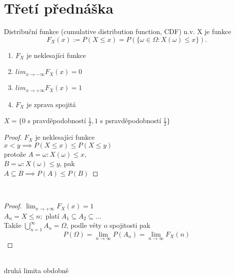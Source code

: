 \documentclass[../main.tex]{subfiles}
\begin{document}
\section{Třetí přednáška}

\begin{definition}
    Distribuční funkce (cumulative distribution function, CDF) n.v. X
    je funkce
    \[F_X(x) := P(X\leq x) = P(\{\omega \in \Omega : X(\omega) \leq x\}).\]
    \begin{enumerate}
        \item $F_X$ je neklesajíci funkce
        \item $lim_{x \rightarrow -\infty} F_X(x) = 0$
        \item $lim_{x \rightarrow +\infty} F_X(x) = 1$
        \item $F_X$ je zprava spojitá
    \end{enumerate}
\end{definition}

\begin{example}
    $X = \{0$ s pravděpodobností $\frac{1}{2}, 1$ s psravděpodobností $\frac{1}{2}\}$
\end{example}
\begin{proof}
    $F_X$ je neklesajíci funkce\\

    $x<y \implies P(X\leq x) \leq P(X\leq y)$\\
    protože $A = {\omega : X(\omega) \leq x}$,\\
    $B = {\omega : X(\omega) \leq y}$, pak\\
    $A\subseteq B \implies P(A) \leq P(B)$
\end{proof}\\
\begin{proof}
    $\lim_{x\rightarrow +\infty} F_X(x) = 1$\\

    $A_n = {X\leq n};$ platí $A_1 \subseteq A_2 \subseteq \dots$\\
    Takže $\bigcup^\infty_{n=1} A_n = \Omega$, podle véty o spojitosti pak\\
    \[P(\Omega) = \lim_{n\rightarrow \infty} P(A_n) = \lim_{n\rightarrow \infty} F_X(n)\]
\end{proof}\\
druhá limita obdobně
\end{document}
